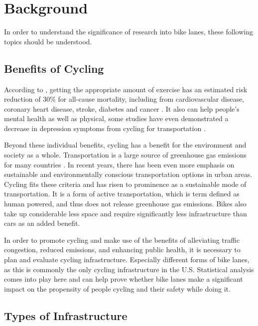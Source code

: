 \documentclass[12pt, letterpaper]{article}
\begin{document}
\section{Background}
\label{sec:Background}

In order to understand the significance of research into bike lanes, these following topics should be understood. 

\subsection{Benefits of Cycling}
\label{sec:benefit}

According to \citet{Gtschi2015}, getting the appropriate amount of exercise has an estimated risk reduction of 30\% for all-cause mortality, including from cardiovascular disease, coronary heart disease, stroke, diabetes and cancer . It also can help people's mental health as well as physical, some studies have even demonstrated a decrease in depression symptoms from cycling for transportation \cite{Green2021}. \par
Beyond these individual benefits, cycling has a benefit for the environment and society as a whole. Transportation is a large source of greenhouse gas emissions for many countries \cite{Green2021}. In recent years, there has been even more emphasis on sustainable and environmentally conscious transportation options in urban areas. Cycling fits these criteria and has risen to prominence as a sustainable mode of transportation. It is a form of active transportation, which is term defined as human powered, and thus does not release greenhouse gas emissions. Bikes also take up considerable less space and require significantly less infrastructure than cars as an added benefit.\par 
In order to promote cycling and make use of the benefits of alleviating traffic congestion, reduced emissions, and enhancing public health, it is necessary to plan and evaluate cycling infrastructure. Especially different forms of bike lanes, as this is commonly the only cycling infrastructure in the U.S. Statistical analysis comes into play here and can help prove whether bike lanes make a significant impact on the propensity of people cycling and their safety while doing it. 

\subsection{Types of Infrastructure}
\label{sec:bikeshare}
\end{document}
